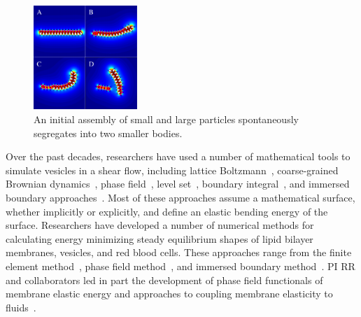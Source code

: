 \begin{figure}
\centerline{\includegraphics[width=0.35\textwidth]{figures/PW_fig2.pdf}}
  \vspace{-8pt}
  \caption{\label{fig:demixing} \footnotesize An initial assembly of
  small and large particles spontaneously segregates into two smaller
  bodies.}
\end{figure}
Over the past decades, researchers have used a number of mathematical
tools to simulate vesicles in a shear flow, including lattice
Boltzmann~\cite{KaouiHartingMisbah2011_PRE}, coarse-grained Brownian
dynamics~\cite{NoguchiTakasu2002_BJ}, phase
field~\cite{DuLiuWang2004_JCP,BibenKassnerMisbah2005_PRE}, level
set~\cite{DoyeuxGuyotChabannesEtAl2013_JCAM}, boundary
integral~\cite{Shravan09,Rahimian15}, and immersed boundary
approaches~\cite{KimLai2010_JCP,KimLai2012_PRE,HuLaiSeolEtAl2016_JCP}.
Most of these approaches assume a mathematical surface, whether
implicitly or explicitly, and define an elastic bending energy of the
surface. Researchers have developed a number of numerical methods for
calculating energy minimizing steady equilibrium shapes of lipid bilayer
membranes, vesicles, and red blood cells. These approaches range from
the finite element method~\cite{Bartels,Peng13,RyKlYaCo16,Sinha15},
phase field method~\cite{Du05,QiangDu08,Lowengrub13}, and immersed
boundary method~\cite{Hu,Hu13, KimLai2010_JCP}. PI RR and collaborators
led in part the development of phase field functionals of membrane
elastic energy and approaches to coupling membrane elasticity to
fluids~\cite{0951-7715-18-3-016,Du05,DuEuler,QiangDu09}.



